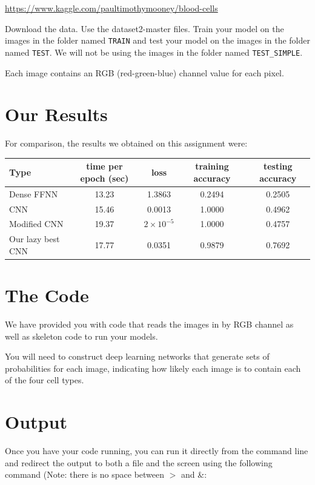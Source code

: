 \documentclass[11pt]{article}
\renewcommand\:{\colon} %
\begin{document}
\url{https://www.kaggle.com/paultimothymooney/blood-cells}


Download the data. Use the dataset2-master files. Train your model on the images in the folder named \texttt{TRAIN} and test your model on the images in the folder named \texttt{TEST}. We will not be using the images in the folder named \texttt{TEST\_SIMPLE}.

Each image contains an RGB (red-green-blue) channel value for each pixel. 

\section*{Our Results}
For comparison, the results we obtained on this assignment were:


    \begin{center}
     \begin{tabular}{l|cccc}
         \hline
         Type & time per epoch (sec) & loss & training accuracy & 
testing accuracy \\
         \hline
         Dense FFNN        & 13.23 & 1.3863             & 0.2494 & 0.2505 \\
         CNN               & 15.46 & 0.0013             & 1.0000 & 0.4962 \\
         Modified CNN      & 19.37 & $2 \times 10^{-5}$ & 1.0000 & 0.4757 \\
         Our lazy best CNN & 17.77 & 0.0351             & 0.9879 & 0.7692 \\
         \hline
     \end{tabular}
     \end{center}
     
 

\section*{The Code}
We have provided you with code that reads the images in by RGB channel as well as skeleton code to run your models.

 You will need to construct deep learning networks that generate  sets of probabilities for each image, indicating how likely each image is to contain each of the four cell types. 
 
 \section*{Output}
 
 Once you have your code running, you can run it directly from the command line and redirect the output to both a file and the screen using the following command (Note: there is no space between $>$ and \&:
 
\end{document}
